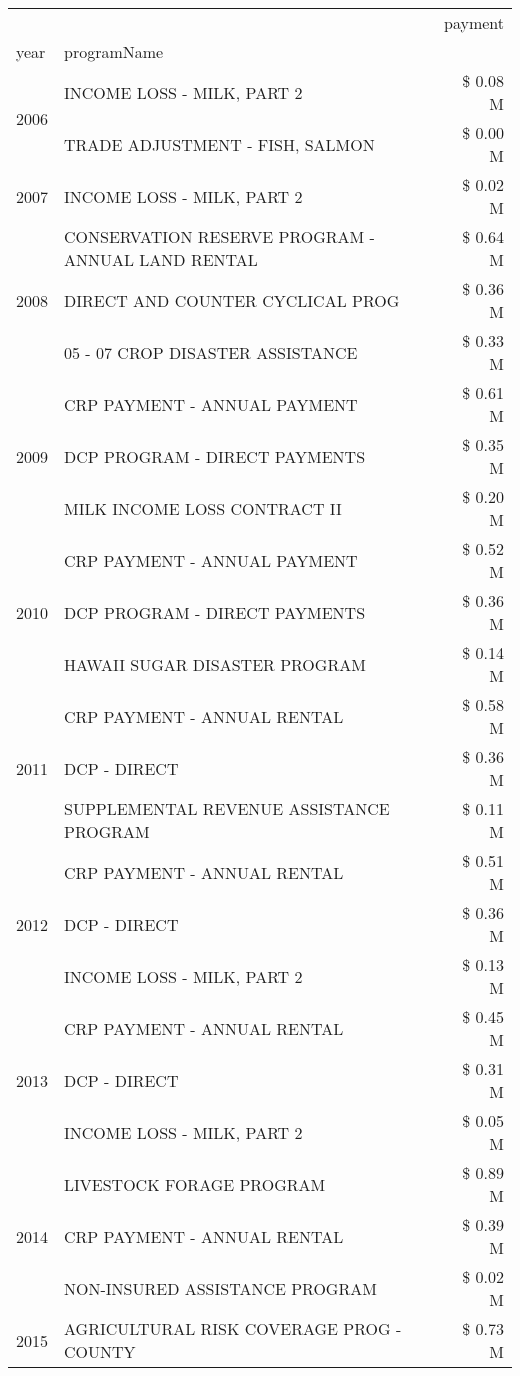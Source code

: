 \begin{tabular}{llr}
\toprule
 &  & payment \\
year & programName &  \\
\midrule
\multirow[t]{2}{*}{2006} & INCOME LOSS - MILK, PART 2 & \$ 0.08 M \\
 & TRADE ADJUSTMENT - FISH, SALMON & \$ 0.00 M \\
\cline{1-3}
2007 & INCOME LOSS - MILK, PART 2 & \$ 0.02 M \\
\cline{1-3}
\multirow[t]{3}{*}{2008} & CONSERVATION RESERVE PROGRAM - ANNUAL LAND RENTAL & \$ 0.64 M \\
 & DIRECT AND COUNTER CYCLICAL PROG & \$ 0.36 M \\
 & 05 - 07 CROP DISASTER ASSISTANCE & \$ 0.33 M \\
\cline{1-3}
\multirow[t]{3}{*}{2009} & CRP PAYMENT - ANNUAL PAYMENT & \$ 0.61 M \\
 & DCP PROGRAM - DIRECT PAYMENTS & \$ 0.35 M \\
 & MILK INCOME LOSS CONTRACT II & \$ 0.20 M \\
\cline{1-3}
\multirow[t]{3}{*}{2010} & CRP PAYMENT - ANNUAL PAYMENT & \$ 0.52 M \\
 & DCP PROGRAM - DIRECT PAYMENTS & \$ 0.36 M \\
 & HAWAII SUGAR DISASTER PROGRAM & \$ 0.14 M \\
\cline{1-3}
\multirow[t]{3}{*}{2011} & CRP PAYMENT - ANNUAL RENTAL & \$ 0.58 M \\
 & DCP - DIRECT & \$ 0.36 M \\
 & SUPPLEMENTAL REVENUE ASSISTANCE PROGRAM & \$ 0.11 M \\
\cline{1-3}
\multirow[t]{3}{*}{2012} & CRP PAYMENT - ANNUAL RENTAL & \$ 0.51 M \\
 & DCP - DIRECT & \$ 0.36 M \\
 & INCOME LOSS - MILK, PART 2 & \$ 0.13 M \\
\cline{1-3}
\multirow[t]{3}{*}{2013} & CRP PAYMENT - ANNUAL RENTAL & \$ 0.45 M \\
 & DCP - DIRECT & \$ 0.31 M \\
 & INCOME LOSS - MILK, PART 2 & \$ 0.05 M \\
\cline{1-3}
\multirow[t]{3}{*}{2014} & LIVESTOCK FORAGE PROGRAM & \$ 0.89 M \\
 & CRP PAYMENT - ANNUAL RENTAL & \$ 0.39 M \\
 & NON-INSURED ASSISTANCE PROGRAM & \$ 0.02 M \\
\cline{1-3}
\multirow[t]{3}{*}{2015} & AGRICULTURAL RISK COVERAGE PROG - COUNTY & \$ 0.73 M \\

\end{tabular}
